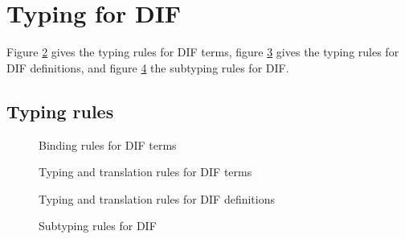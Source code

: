 \section{Typing for DIF}
Figure \ref{typing_rules_terms} gives the typing rules for DIF terms, figure
\ref{typing_rules_definitions} gives the typing rules for DIF definitions, and
figure \ref{subtyping_rules} the subtyping rules for DIF.

\subsection{Typing rules}

\begin{figure}[h]
    
    \caption{Binding rules for DIF terms}
    \label{binding_rules}
\end{figure}

\begin{figure}[h]
    
    \caption{Typing and translation rules for DIF terms}
    \label{typing_rules_terms}
\end{figure}

\begin{figure}[h]
    
    \caption{Typing and translation rules for DIF definitions}
    \label{typing_rules_definitions}
\end{figure}

\begin{figure}[h]
    
    \caption{Subtyping rules for DIF}
    \label{subtyping_rules}
\end{figure}
